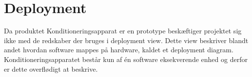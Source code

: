 \section{Deployment}
Da produktet Konditioneringsapparat er en prototype beskæftiger projektet sig ikke med de redskaber der bruges i deployment view. Dette view beskriver blandt andet hvordan software mappes på hardware, kaldet et deployment diagram. Konditioneringsapparatet består kun af én software eksekverende enhed og derfor er dette overflødigt at beskrive. 

